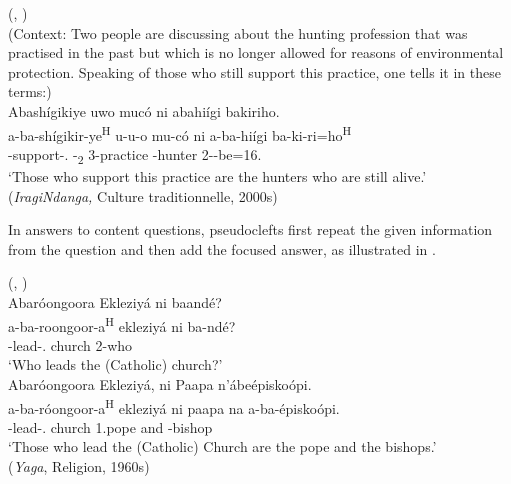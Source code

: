 \documentclass[output=paper]{langscibook}
\begin{document}
\ea
\label{bkm:Ref106310149}
(\citealt[244]{Nshemezimana2016}, \citealt[90]{LafkiouiEtAl2016})\\
(Context: Two people are discussing about the hunting profession that was practised in the past but which is no longer allowed for reasons of environmental protection. Speaking of those who still support this practice, one tells it in these terms:) \\
Abashígikiye uwo mucó ni abahiígi bakiriho.\\
\gll
a-ba-shígikir-ye\textsuperscript{H} u-u-o  mu-có  ni  a-ba-hiígi   ba-ki-ri=ho\textsuperscript{H} \\
-support-\PFV.\REL{}  -\DEM{}\textsubscript{2}  3-practice  \COP{}  -hunter   2\SM-\PERS{}-be=16.\REL{} \\
\glt
‘Those who support this practice are the hunters who are still alive.’\\ 
(\textit{IragiNdanga,} Culture traditionnelle, 2000s)\\

\z

In answers to content questions, pseudoclefts first repeat the given information from the question and then add the focused answer, as illustrated in .

\ea
\label{bkm:Ref119734746}
(\citealt[245]{Nshemezimana2016}, \citealt[93--94]{LafkiouiEtAl2016})\\
\ea
Abaróongoora Ekleziyá ni baandé? \\
\gll
a-ba-roongoor-a\textsuperscript{H}\textsuperscript{} ekleziyá  ni  ba-ndé?\\
-lead-\FV.\REL{}  church  \COP{}  2-who\\
\glt
‘Who leads the (Catholic) church?’\\

\ex
Abaróongoora Ekleziyá, ni Paapa n’ábeépiskoópi.\\
\gll
a-ba-róongoor-a\textsuperscript{H} ekleziyá  ni  paapa  na  a-ba-épiskoópi.\\
-lead-\FV.\REL{}  church  \COP{}  1.pope  and  -bishop\\
\glt
‘Those who lead the (Catholic) Church are the pope and the bishops.’\\
  (\textit{Yaga}, Religion, 1960s)
\end{document}
